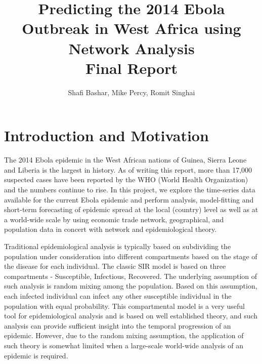 \documentclass[10pt, journal,onecolumn]{IEEEtran}
\title{Predicting the 2014 Ebola Outbreak in West Africa using Network Analysis \\
       {\large Final Report} }
\author{Shafi Bashar, Mike Percy, Romit  Singhai}
\affil{\textit {\{shafiab, mp81, romit\}@stanford.edu}}
\begin{document}
\maketitle



\section{{Introduction and Motivation}}
\label{sec:Introduction}

The 2014 Ebola epidemic in the West African nations of Guinea, Sierra Leone and Liberia is the
largest in history. As of writing this report, more than 17,000
suspected cases have been reported by the WHO (World Health Organization) and the numbers continue
to rise. In this project, we explore
the time-series data available for the current Ebola epidemic and perform analysis, model-fitting and
short-term forecasting of epidemic spread at the local (country) level as well as at a world-wide scale by
using economic trade network, geographical, and population data in concert with network and epidemiological theory.

Traditional epidemiological analysis is typically based on subdividing the population under
consideration into different compartments based on the stage of the disease for each individual. The
classic SIR model is based on three compartments - Susceptible, Infectious, Recovered. The
underlying assumption of such analysis is random mixing among the population. Based on this assumption,
each infected individual can infect any other susceptible individual in the population with equal
probability. This compartmental model is a very useful tool for epidemiological analysis and is based
on well established theory, and such analysis can provide sufficient insight into the temporal
progression of an epidemic. However, due to the random mixing assumption, the application of such
theory is somewhat limited when a large-scale world-wide analysis of an epidemic is required.
\end{document}
